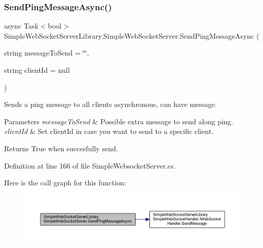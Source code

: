 \subsubsection{\texorpdfstring{Send\+Ping\+Message\+Async()}{SendPingMessageAsync()}}
{\footnotesize\ttfamily async Task$<$bool$>$ Simple\+Web\+Socket\+Server\+Library.\+Simple\+Web\+Socket\+Server.\+Send\+Ping\+Message\+Async (\begin{DoxyParamCaption}\item[{string}]{message\+To\+Send = {\ttfamily \char`\"{}\char`\"{}},  }\item[{string}]{client\+Id = {\ttfamily null} }\end{DoxyParamCaption})}



Sends a ping message to all clients asynchronous, can have message. 


\begin{DoxyParams}{Parameters}
{\em message\+To\+Send} & Possible extra message to send along ping.\\
\hline
{\em client\+Id} & Set client\+Id in case you want to send to a specific client.\\
\hline
\end{DoxyParams}
\begin{DoxyReturn}{Returns}
True when succesfully send.
\end{DoxyReturn}


Definition at line 166 of file Simple\+Websocket\+Server.\+cs.

Here is the call graph for this function\+:
\nopagebreak
\begin{figure}[H]
\begin{center}
\leavevmode
\includegraphics[width=350pt]{class_simple_web_socket_server_library_1_1_simple_web_socket_server_a7f0eca90a424040685527ac873c31229_cgraph}
\end{center}
\end{figure}
\mbox{\label{class_simple_web_socket_server_library_1_1_simple_web_socket_server_af1f35a19ed0272c0bd02bf51f175b4b7}} 
